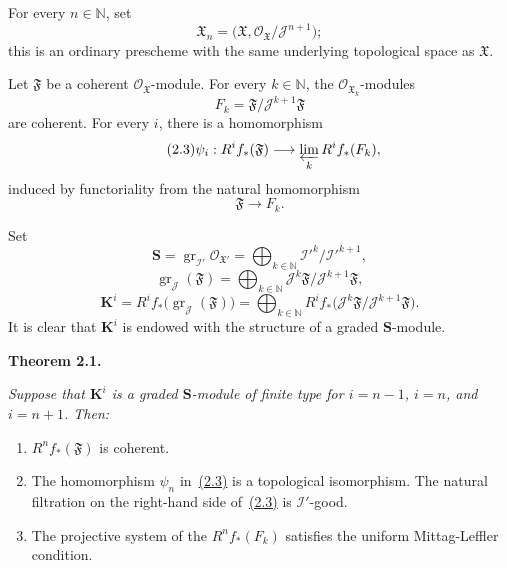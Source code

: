 \documentclass[11pt,a4paper,oneside]{book}
\theoremstyle{plain}
\theoremstyle{definition}
\theoremstyle{remark}
\begin{document}
For every $n\in\mathbb N$, set
\begin{equation}\label{eq:IX.2.1}
  \mathfrak X_n=
  \bigl(\mathfrak X,\mathcal O_{\mathfrak X}/\mathcal J^{n+1}\bigr);
\end{equation}
this is an ordinary prescheme with the same underlying topological space as
$\mathfrak X$.

Let $\mathfrak F$ be a coherent $\mathcal O_{\mathfrak X}$-module. For every
$k\in\mathbb N$, the $\mathcal O_{\mathfrak X_k}$-modules
\begin{equation}
\tag{2.2}\label{eq:IX.2.2}
F_k=\mathfrak F/\mathcal J^{k+1}\mathfrak F
\end{equation}
are coherent. For every $i$, there is a homomorphism
\begin{equation}
\tag{2.3}\label{eq:IX.2.3}
\psi_i:R^i f_*(\mathfrak F)
  \longrightarrow\varprojlim_k R^i f_*(F_k),
\end{equation}
induced by functoriality from the natural homomorphism
\begin{equation}
\tag{2.4}\label{eq:IX.2.4}
\mathfrak F\longrightarrow F_k.
\end{equation}

Set
\begin{equation}
\tag{2.5}\label{eq:IX.2.5}
\mathbf S
  =\operatorname{gr}_{\mathcal I'}\mathcal O_{\mathfrak X'}
  =\bigoplus_{k\in\mathbb N}\mathcal I'^{k}/\mathcal I'^{k+1},
\end{equation}
\begin{equation}
\tag{2.6}\label{eq:IX.2.6}
\operatorname{gr}_{\mathcal J}(\mathfrak F)
  =\bigoplus_{k\in\mathbb N}
    \mathcal J^{k}\mathfrak F/\mathcal J^{k+1}\mathfrak F,
\end{equation}
\begin{equation}
\tag{2.7}\label{eq:IX.2.7}
\mathbf K^{i}
  =R^{i}f_*\bigl(\operatorname{gr}_{\mathcal J}(\mathfrak F)\bigr)
  =\bigoplus_{k\in\mathbb N}
    R^{i}f_*\bigl(\mathcal J^{k}\mathfrak F/
      \mathcal J^{k+1}\mathfrak F\bigr).
\end{equation}
It is clear that $\mathbf K^{i}$ is endowed with the structure of a graded
$\mathbf S$-module.

\medskip
\noindent\textbf{Theorem 2.1.}\quad
{\itshape Suppose that $\mathbf K^i$ is a graded $\mathbf S$-module of finite
type for $i=n-1$, $i=n$, and $i=n+1$. Then:
\begin{enumerate}
\renewcommand{\labelenumi}{(\roman{enumi})}
\setlength{\itemsep}{0.35em}
\item $R^n f_*(\mathfrak F)$ is coherent.
\item The homomorphism $\psi_n$ in~\hyperref[eq:IX.2.3]{(2.3)} is a topological isomorphism. The
natural filtration on the right-hand side of~\hyperref[eq:IX.2.3]{(2.3)} is $\mathcal I'$-good.
\item The projective system of the $R^n f_*(F_k)$ satisfies the uniform
Mittag-Leffler condition.
\end{enumerate}}
\end{document}

